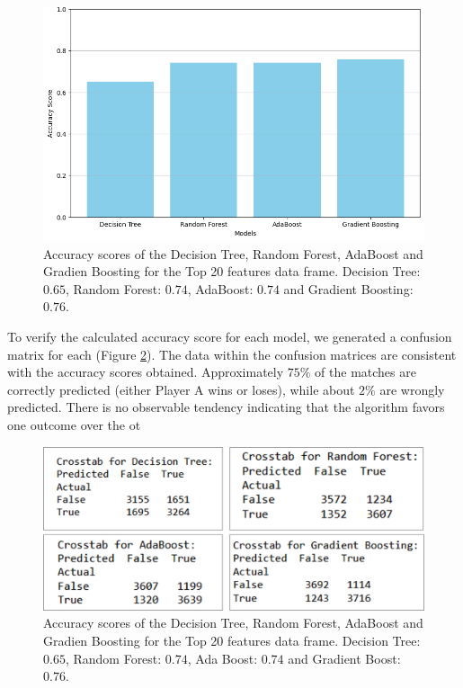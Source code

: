\documentclass[preprint,aps,nofootinbib,a4paper,superscriptaddress,longbibliography,amsfonts,amssymb,amsmath,titlepage]{revtex4-2}
\begin{document}
%
\begin{figure}[h]
\includegraphics[width=\textwidth]{pictures/accuracy-score-models.png}
\caption{Accuracy scores of the Decision Tree, Random Forest, AdaBoost and Gradien Boosting for the Top 20 features data frame. Decision Tree: $0.65$, Random Forest: $0.74$, AdaBoost: $0.74$ and Gradient Boosting: $0.76$.}
\label{accuracy-score-models}
\end{figure}

To verify the calculated accuracy score for each model, we generated a confusion matrix for each (Figure \ref{confusion-matrix}). The data within the confusion matrices are consistent with the accuracy scores obtained. Approximately $75 \%$ of the matches are correctly predicted (either Player A wins or loses), while about $2 \%$ are wrongly predicted. There is no observable tendency indicating that the algorithm favors one outcome over the ot 
%
\begin{figure}[h]
\includegraphics[width=\textwidth]{pictures/confusion-matrix.png}
\caption{Accuracy scores of the Decision Tree, Random Forest, AdaBoost and Gradien Boosting for the Top 20 features data frame. Decision Tree: $0.65$, Random Forest: $0.74$, Ada Boost: $0.74$ and Gradient Boost: $0.76$.}
\label{confusion-matrix}
\end{figure}
%
\end{document}
